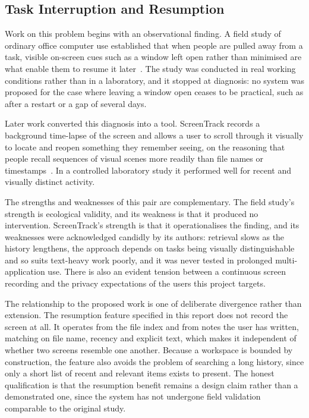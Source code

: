 \documentclass{FastFyp}
\begin{document}
\subsection{Task Interruption and Resumption}
Work on this problem begins with an observational finding. A field study of ordinary office computer use established that when people are pulled away from a task, visible on-screen cues such as a window left open rather than minimised are what enable them to resume it later~\cite{ref:iqbal2007}. The study was conducted in real working conditions rather than in a laboratory, and it stopped at diagnosis: no system was proposed for the case where leaving a window open ceases to be practical, such as after a restart or a gap of several days.

Later work converted this diagnosis into a tool. ScreenTrack records a background time-lapse of the screen and allows a user to scroll through it visually to locate and reopen something they remember seeing, on the reasoning that people recall sequences of visual scenes more readily than file names or timestamps~\cite{ref:hu2020}. In a controlled laboratory study it performed well for recent and visually distinct activity.

The strengths and weaknesses of this pair are complementary. The field study's strength is ecological validity, and its weakness is that it produced no intervention. ScreenTrack's strength is that it operationalises the finding, and its weaknesses were acknowledged candidly by its authors: retrieval slows as the history lengthens, the approach depends on tasks being visually distinguishable and so suits text-heavy work poorly, and it was never tested in prolonged multi-application use. There is also an evident tension between a continuous screen recording and the privacy expectations of the users this project targets.

The relationship to the proposed work is one of deliberate divergence rather than extension. The resumption feature specified in this report does not record the screen at all. It operates from the file index and from notes the user has written, matching on file name, recency and explicit text, which makes it independent of whether two screens resemble one another. Because a workspace is bounded by construction, the feature also avoids the problem of searching a long history, since only a short list of recent and relevant items exists to present. The honest qualification is that the resumption benefit remains a design claim rather than a demonstrated one, since the system has not undergone field validation comparable to the original study.
\end{document}
